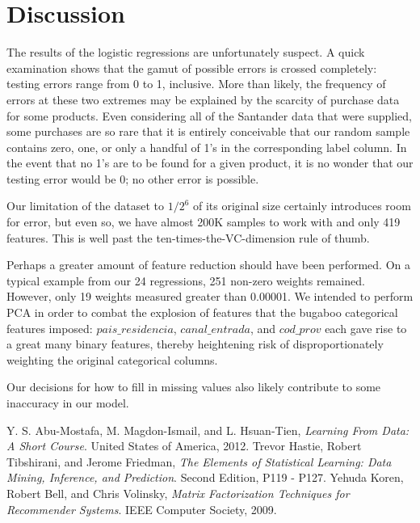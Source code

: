 \documentclass{report}
\begin{document}
\section{Discussion}

The results of the logistic regressions are unfortunately suspect. A quick examination shows that the gamut of possible errors is crossed completely: testing errors range from 0 to 1, inclusive. More than likely, the frequency of errors at these two extremes may be explained by the scarcity of purchase data for some products. Even considering all of the Santander data that were supplied, some purchases are so rare that it is entirely conceivable that our random sample contains zero, one, or only a handful of 1's in the corresponding label column. In the event that no 1's are to be found for a given product, it is no wonder that our testing error would be 0; no other error is possible.

Our limitation of the dataset to $1/2^6$ of its original size certainly introduces room for error, but even so, we have almost 200K samples to work with and only 419 features. This is well past the ten-times-the-VC-dimension rule of thumb.\cite{amlbook} 

Perhaps a greater amount of feature reduction should have been performed. On a typical example from our 24 regressions, 251 non-zero weights remained. However, only 19 weights measured greater than 0.00001. We intended to perform PCA in order to combat the explosion of features that the bugaboo categorical features imposed: $pais\_residencia$, $canal\_entrada$, and $cod\_prov$ each gave rise to a great many binary features, thereby heightening risk of disproportionately weighting the original categorical columns.

Our decisions for how to fill in missing values also likely contribute to some inaccuracy in our model.

\begin{thebibliography}{9}

Y. S. Abu-Mostafa, M. Magdon-Ismail, and  L. Hsuan-Tien, \textit{Learning From Data: A Short Course}. United States of America, 2012.
Trevor Hastie, Robert Tibshirani, and  Jerome Friedman, 
\textit{The Elements of Statistical Learning: Data Mining, Inference, and Prediction}. Second Edition, P119 - P127.
Yehuda Koren, Robert Bell, and  Chris Volinsky, 
\textit{Matrix Factorization Techniques for Recommender Systems}. IEEE Computer Society, 2009.

\end{thebibliography}
\end{document}
